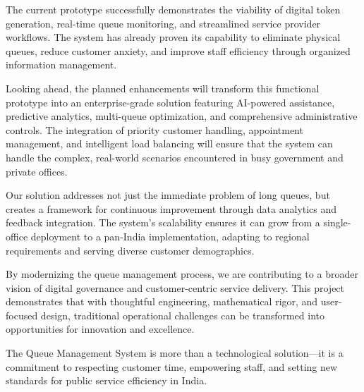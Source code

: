 \documentclass[12pt,a4paper]{report}
\begin{document}
The current prototype successfully demonstrates the viability of digital token generation, real-time queue monitoring, and streamlined service provider workflows. The system has already proven its capability to eliminate physical queues, reduce customer anxiety, and improve staff efficiency through organized information management.

Looking ahead, the planned enhancements will transform this functional prototype into an enterprise-grade solution featuring AI-powered assistance, predictive analytics, multi-queue optimization, and comprehensive administrative controls. The integration of priority customer handling, appointment management, and intelligent load balancing will ensure that the system can handle the complex, real-world scenarios encountered in busy government and private offices.

Our solution addresses not just the immediate problem of long queues, but creates a framework for continuous improvement through data analytics and feedback integration. The system's scalability ensures it can grow from a single-office deployment to a pan-India implementation, adapting to regional requirements and serving diverse customer demographics.

By modernizing the queue management process, we are contributing to a broader vision of digital governance and customer-centric service delivery. This project demonstrates that with thoughtful engineering, mathematical rigor, and user-focused design, traditional operational challenges can be transformed into opportunities for innovation and excellence.

The Queue Management System is more than a technological solution—it is a commitment to respecting customer time, empowering staff, and setting new standards for public service efficiency in India.
\end{document}
